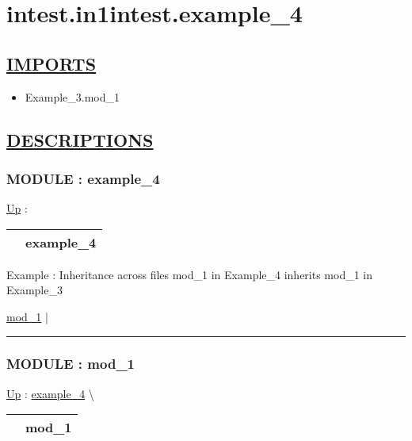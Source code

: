 \chapter*{intest.in1intest.example\_4}
\hypertarget{ecldoc:toc:intest.in1intest.example_4}{}

\section*{\underline{IMPORTS}}
\begin{itemize}
\item Example\_3.mod\_1
\end{itemize}

\section*{\underline{DESCRIPTIONS}}
\subsection*{MODULE : example\_4}
\hypertarget{ecldoc:intest.in1intest.example_4}{}
\hyperlink{ecldoc:toc:intest/in1intest}{Up} :

{\renewcommand{\arraystretch}{1.5}
\begin{tabularx}{\textwidth}{|>{\raggedright\arraybackslash}l|X|}
\hline
\hspace{0pt} & example\_4 \\
\hline
\end{tabularx}
}

\par
Example : Inheritance across files mod\_1 in Example\_4 inherits mod\_1 in Example\_3


\hyperlink{ecldoc:intest.in1intest.example_4.mod_1}{mod\_1}  |

\rule{\linewidth}{0.5pt}

\subsection*{MODULE : mod\_1}
\hypertarget{ecldoc:intest.in1intest.example_4.mod_1}{}
\hyperlink{ecldoc:intest.in1intest.example_4}{Up} :
\hspace{0pt} \hyperlink{ecldoc:intest.in1intest.example_4}{example_4} \textbackslash 

{\renewcommand{\arraystretch}{1.5}
\begin{tabularx}{\textwidth}{|>{\raggedright\arraybackslash}l|X|}
\hline
\hspace{0pt} & mod\_1 \\
\hline
\end{tabularx}
}


